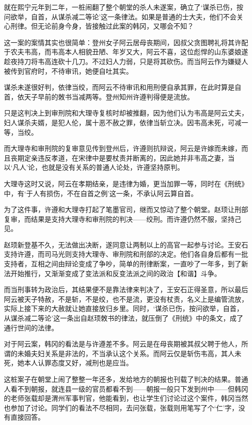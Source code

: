 就在熙宁元年到二年，一桩闹翻了整个朝堂的杀人未遂案，确立了‘谋杀已伤，按问欲举，自首，从谋杀减二等论’这一条律法。如果是普通的士大夫，他们不会关心刑律。但无论前身今身，皆接触过此案的韩冈，又哪会不知？

这一案的案情其实也很简单：登州女子阿云居母丧期间，因叔父贪图聘礼将其许配于农夫韦高，而韦高本人相貌丑陋、年岁又大，阿云不喜，这位彪悍的山东婆娘遂趁夜持刀将韦高连砍十几刀。不过妇人力弱，只是将其砍伤。而当阿云作为嫌疑人被传到官府时，不待审讯，她便自吐其实。

谋杀未遂很好判，依律当绞，而阿云不待审讯和用刑便自承其罪，在此时算是自首，依天子早前的敇书当减两等。登州知州许遵判得便是流放。

只是这判决上到审刑院和大理寺复核时却被推翻，因为他们认为韦高是阿云丈夫，妇人谋杀夫婿，是犯人伦，属十恶不赦之罪，依律当斩立决。因韦高未死，可减一等，当绞。

而大理寺和审刑院的复审意见传到登州后，许遵则抗辩说，阿云是许嫁而未嫁，而且丧期定亲违反孝道，在宋律中是要杖责并断离的，因此她并非韦高之妻，当以‘凡人’论，也就是没有关系的普通人论处，许遵坚持原判。

大理寺这时又说，阿云在孝期结亲，是违律为婚，更当加罪一等，同时在《刑统》中，有‘于人有损伤，不在自首之例’这一条，不承认阿云算自首。

为了这件事，许遵和大理寺打起了笔墨官司，继而又惊动了整个朝堂。赵顼让刑部复审，而结果是支持大理寺和审刑院的判决——绞刑。而许遵仍然不服，坚持己见。

赵顼新登基不久，无法做出决断，遂同意让两制以上的高官一起参与讨论。王安石支持许遵，而司马光则支持大理寺、审刑院和刑部的决定。他们各自身后都有一批支持者，互相之间由辩论变成了争吵，简单的刑律断案，一直吵了一年多，到了新法开始推行，又渐渐变成了变法派和反变法派之间的政治【和谐】斗争。

而当刑事转为政治后，其结果便不是靠法律来判决了，王安石正得圣意，所以最后阿云被天子特赦，不是斩，不是绞，也不是流，更没有杖责，名义上是编管流放，实际上接下来的大赦就让她直接放归乡里。同时，‘谋杀已伤，按问欲举，自首，从谋杀减二等论’这一条出自赵顼敇书的律法，就压倒了《刑统》中的条文，成了通行世间的法律。

对于阿云案，韩冈的看法是与许遵差不多。阿云是在母丧期被其叔父聘于他人，所谓的未婚夫妇关系是非法的，不当承认这个关系。而阿云仅是斩伤韦高，其人未死，她本人认罪态度又好，减刑也是应当。

这桩案子在朝堂上闹了整整一年还多，发给地方的朝报也刊载了判决的结果。普通人看不到朝报，就连县一级的官员都看不到——朝报一般只下发到州中——但韩冈的老师张载却是渭州军事判官，他能看到，也让学生们讨论过这个案件，韩冈当然也参加了讨论。同学们的看法不尽相同，去问张载，张载则用笔写了个‘仁’字，没有直接回答。

